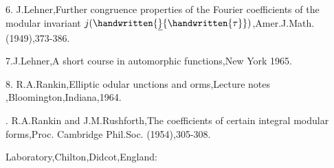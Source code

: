6. J.Lehner,Further congruence properties of the Fourier coefficients of the modular invariant $j(\handwritten{\underline}{\handwritten{\tau}})$,Amer.J.Math.(1949),373-386.

7.J.Lehner,A short course in automorphic functions,New York 1965.

8. R.A.Rankin,Elliptic odular unctions and orms,Lecture notes ,Bloomington,Indiana,1964.

. R.A.Rankin and J.M.Rushforth,The coefficients of certain integral modular forms,Proc. Cambridge Phil.Soc. (1954),305-308.\margin{\handwritten{\#}}

   Laboratory,Chilton,Didcot,England:
